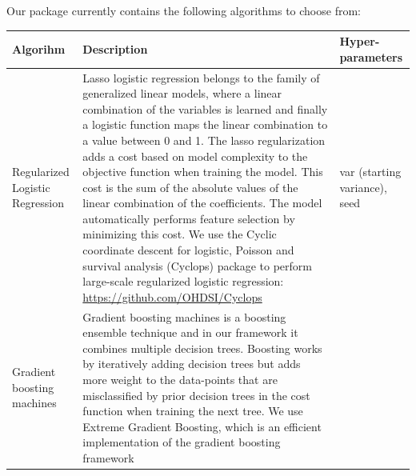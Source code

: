 \documentclass[
]{article}
\begin{document}
Our package currently contains the following algorithms to choose from:

\begin{longtable}[]{@{}lll@{}}
\toprule
\begin{minipage}[b]{0.11\columnwidth}\raggedright
Algorihm\strut
\end{minipage} & \begin{minipage}[b]{0.55\columnwidth}\raggedright
Description\strut
\end{minipage} & \begin{minipage}[b]{0.25\columnwidth}\raggedright
Hyper-parameters\strut
\end{minipage}\tabularnewline
\midrule
\endhead
\begin{minipage}[t]{0.11\columnwidth}\raggedright
Regularized Logistic Regression\strut
\end{minipage} & \begin{minipage}[t]{0.55\columnwidth}\raggedright
Lasso logistic regression belongs to the family of generalized linear
models, where a linear combination of the variables is learned and
finally a logistic function maps the linear combination to a value
between 0 and 1. The lasso regularization adds a cost based on model
complexity to the objective function when training the model. This cost
is the sum of the absolute values of the linear combination of the
coefficients. The model automatically performs feature selection by
minimizing this cost. We use the Cyclic coordinate descent for logistic,
Poisson and survival analysis (Cyclops) package to perform large-scale
regularized logistic regression:
\url{https://github.com/OHDSI/Cyclops}\strut
\end{minipage} & \begin{minipage}[t]{0.25\columnwidth}\raggedright
var (starting variance), seed\strut
\end{minipage}\tabularnewline
\begin{minipage}[t]{0.11\columnwidth}\raggedright
Gradient boosting machines\strut
\end{minipage} & \begin{minipage}[t]{0.55\columnwidth}\raggedright
Gradient boosting machines is a boosting ensemble technique and in our
framework it combines multiple decision trees. Boosting works by
iteratively adding decision trees but adds more weight to the
data-points that are misclassified by prior decision trees in the cost
function when training the next tree. We use Extreme Gradient Boosting,
which is an efficient implementation of the gradient boosting framework

\end{minipage}
\end{longtable}
\end{document}
